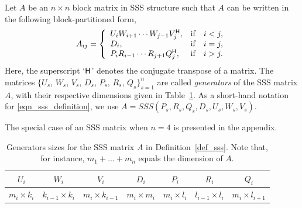 {\begin{definition}\label{def_sss}
Let $A$ be an $n \times n$ block matrix in SSS structure such that $A$ can be written in the following block-partitioned form,
\begin{equation}\label{eqn_sss_definition}
    A_{ij}=\left\{
        \begin{array}{ll}
            U_iW_{i+1}\cdots W_{j-1}V_j^{\mathsf{H}}, & \text{if}\quad i<j, \\
            D_i, & \text{if}\quad i=j, \\
            P_iR_{i-1}\cdots R_{j+1}Q_j^{\mathsf{H}}, & \text{if}\quad i>j.
        \end{array} 
       \right.
\end{equation}
Here, the superscript `$\mathsf{H}$' denotes the conjugate transpose of a matrix. The matrices $\displaystyle \{ U_s$, $W_s$, $V_s$, $D_s$, $P_s$, $R_s$, $Q_s \}_{s=1}^n$ 
are called \textit{generators} of the SSS matrix $A$, with their respective dimensions given in Table~\ref{tab_sss_size}. As a short-hand notation for \eqref{eqn_sss_definition}, we use $A = SSS(P_s, R_s, Q_s, D_s, U_s, W_s, V_s)$.%
\end{definition}
The special case of an SSS matrix when $n=4$ is presented in the appendix.
\begin{table}[ht]
\footnotesize
\centering
\caption{Generators sizes for the SSS matrix $A$ in Definition~\ref{def_sss}. Note that, for instance, $m_1+...+m_n$ equals the dimension of $A$.}\label{tab_sss_size}
\setlength{\tabcolsep}{.4em}
\begin{tabular}{ccccccc}
\hline
 $U_i$ & $W_i$ & $V_i$ & $D_i$ & $P_i$ & $R_i$ & $Q_i$ \\
\hline
 $m_i\times k_i$ & $k_{i-1}\times k_i$ & $m_i\times k_{i-1}$ & $m_i\times m_i$ & $m_i\times l_i$ & $l_{i-1}\times l_i$ & $m_i\times l_{i+1}$ \\
\hline
\end{tabular}
\end{table}


}
